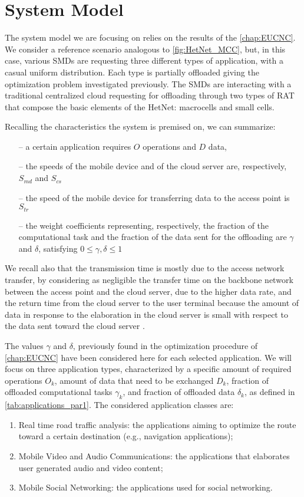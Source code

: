 \documentclass[twoside,openright]{report}
\begin{document}
\section{System Model}
\label{sec:system}
The system model we are focusing on relies on the results of the \autoref{chap:EUCNC}. We consider a reference scenario analogous to \autoref{fig:HetNet_MCC}, but, in this case, various \glspl{SMD} are requesting three different types of application, with a casual uniform distribution. Each type is partially offloaded giving the optimization problem investigated previously.
The \glspl{SMD}  are interacting with a traditional centralized cloud requesting for offloading through two types of \gls{RAT} that compose the basic elements of the \gls{HetNet}: macrocells and small cells. 

Recalling the characteristics  the system is premised on, we can summarize:
\begin{itemize}  
\item[--]{
a certain application requires $O$ operations and $D$ data,} 
\item[--]{the speeds of the mobile device and of the cloud server are, respectively, $S_{\textit{md}}$ and $S_{\textit{cs}}$ }

\item[--]{the speed of the mobile device for transferring data to the access point is $S_{\textit{tr}}$}
\item[--]{the weight coefficients representing, respectively, the fraction of the computational task and the fraction of the data sent for the offloading are ${\gamma}$ and ${\delta}$, satisfying ${0 \le \gamma ,\delta \le 1}$}
\end{itemize}
We recall also that the transmission time is mostly due to the access network transfer, by considering as negligible the transfer time on the backbone network between the access point and the cloud server, due to the higher data rate, and the return time from the cloud server to the user terminal because the amount of data in response to the elaboration in the cloud server is small with respect to the data sent toward the cloud server \cite{Kumar,Tradeoff}.

The values $\gamma$ and $\delta$, previously found in the optimization procedure of \autoref{chap:EUCNC} have been considered here for each selected application. We will focus on three application types, characterized by a specific amount of required operations $O_k$, amount of data that need to be exchanged $D_k$, fraction of offloaded computational tasks $\gamma_k$, and fraction of offloaded data $\delta_k$, as defined in \autoref{tab:applications_par1}. 
The considered application classes are:
\begin{enumerate}
\item Real time road traffic analysis: the applications aiming to optimize the route toward a certain destination (e.g., navigation applications);
\item Mobile Video and Audio Communications: the applications that elaborates user generated audio and video content;
\item Mobile Social Networking: the applications used for social networking.
\end{enumerate}
\end{document}
